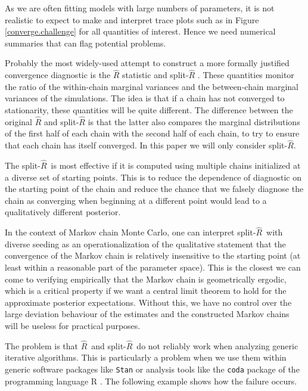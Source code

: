\documentclass[american,]{article}
\newcommand{\Rhat}{$\widehat{R}$}
\newcommand{\sRhat}{split-$\widehat{R}$}
\theoremstyle{definition}
\begin{document}
As we are often fitting models with large
numbers of parameters, it is not realistic to expect to make and interpret
trace plots such as in Figure \ref{converge.challenge} for all
quantities of interest. Hence we need numerical summaries that can flag
potential problems. 


Probably the most widely-used attempt to construct a more formally justified 
convergence diagnostic  is the  \(\widehat{R}\) statistic
\citep{Gelman+Rubin:1992, Brooks+Gelman:1998} and
split-\(\widehat{R}\) \citep{BDA3}.  These quantities monitor the ratio of
the within-chain marginal variances and the between-chain marginal variances
of the simulations. The idea is that if a chain has not converged to 
stationarity, these quantities will be quite different.  The difference between
the original $\widehat{R}$ and split-$\widehat{R}$ is that the latter also compares 
the marginal distributions of the first half of each chain with the second
half of each chain, to try to ensure that each chain has itself converged.  In this
paper we will only consider \sRhat .

The \sRhat\ is most effective if it is computed using multiple chains initialized at a 
diverse set of starting points. This is to reduce the dependence of diagnostic
on the starting point of the chain and reduce the chance that we falsely diagnose
the chain as converging when beginning at a different point would lead to a 
qualitatively different posterior.

In the context of Markov chain Monte Carlo, one can interpret \sRhat\ 
with diverse seeding as an operationalization of the qualitative statement 
that the convergence of the Markov chain is relatively insensitive to the starting 
point (at least within a 
reasonable part of the parameter space). This is the closest we can come to 
verifying empirically that the Markov chain is geometrically ergodic, which is a critical 
property if we want  a central limit theorem to hold for the approximate
posterior expectations. Without this, we have no control over the large
deviation behaviour of the estimates and the constructed Markov chains will
be useless for practical purposes.

 
The problem is that \Rhat\ and \sRhat\ do not reliably work when analyzing 
generic iterative algorithms.  This is particularly a problem when we use them 
within generic software packages like \texttt{Stan} \citep{Stan:JSS:2017} or 
analysis tools like the \texttt{coda} package \citep{coda2006} of the 
programming language R \citep{R2018}. The following example shows how the 
failure occurs.
\end{document}
